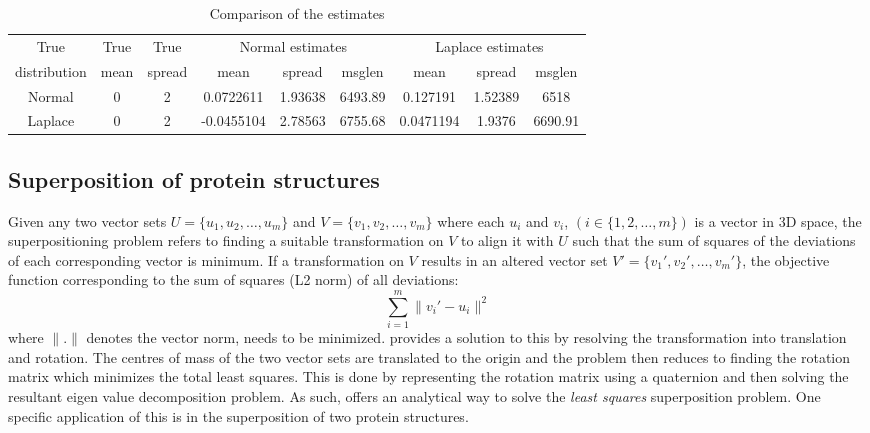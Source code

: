 \documentclass[wcp]{jmlr}
\begin{document}
\begin{table}[h]
\centering
\caption{Comparison of the estimates}
\label{tab:comparison_estimates}
\begin{tabular}{|c|c|c|c|c|c|c|c|c|}
\hline
True & True & True & \multicolumn{3}{c|}{Normal estimates} & \multicolumn{3}{c|}{Laplace estimates} \\ \cline{4-9} 
distribution & mean & spread & mean & spread & msglen & mean & spread & msglen \\ \hline 
Normal & 0 & 2 & 0.0722611 & 1.93638 & 6493.89 & 0.127191 & 1.52389 & 6518 \\ \hline
Laplace & 0 & 2 & -0.0455104 & 2.78563 & 6755.68 & 0.0471194 & 1.9376 & 6690.91 \\ \hline
\end{tabular}
\end{table}

\subsection{Superposition of protein structures}
Given any two vector sets $U = \{u_1,u_2,\ldots,u_m\}$ and $V = \{v_1,v_2,\ldots,v_m\}$
where each $u_i$ and $v_i$, $(i \in \{1,2,\ldots,m\})$ is a vector in 3D space, the 
superpositioning problem refers to finding a suitable transformation on $V$ to
align it with $U$ such that the sum of squares of the deviations of each corresponding
vector is minimum. If a transformation on $V$ results in an altered vector set 
$V'=\{v_1',v_2',\ldots,v_m'\}$, the objective function corresponding to the
sum of squares (L2 norm) of all deviations: 
\begin{equation} 
  \sum_{i=1}^m \|v_i'-u_i\|^2
\end{equation} where $\|.\|$ denotes the vector
norm, needs to be minimized. \citet{kearsley89} provides a solution to this by 
resolving the transformation into translation and rotation. The centres of mass of the
two vector sets are translated to the origin and the problem then reduces to finding the
rotation matrix which minimizes the total least squares. This is done by representing
the rotation matrix using a quaternion and then solving the resultant eigen value 
decomposition problem. As such, \citet{kearsley89} offers an analytical way to solve
the \emph{least squares} superposition problem. One specific application of this is in the
superposition of two protein structures. \\
\end{document}
